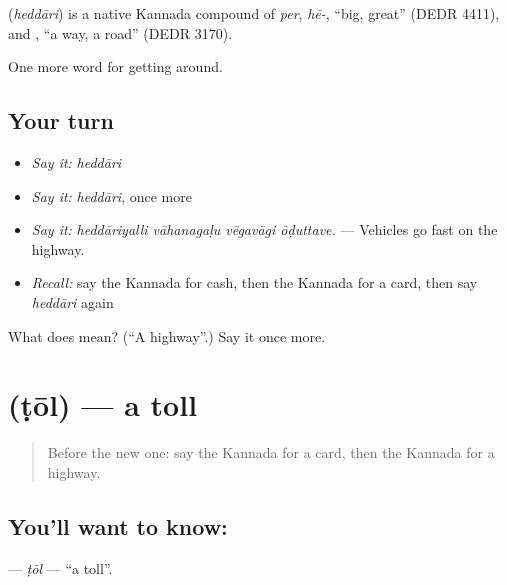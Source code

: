\begin{cousinweb}
\textbf{} (\emph{heddāri}) is a native Kannada compound of \emph{per}, \emph{hē-}, \textquotedblleft{}big, great\textquotedblright{} (DEDR 4411), and , \textquotedblleft{}a way, a road\textquotedblright{} (DEDR 3170).
\end{cousinweb}

\begin{grammarlens}[title={What you've built}]
One more word for getting around.
\end{grammarlens}

\subsection*{Your turn}
\begin{itemize}
\raggedright
  \item \emph{Say it:} \emph{heddāri}
  \item \emph{Say it:} \emph{heddāri}, once more
  \item \emph{Say it:} \emph{heddāriyalli vāhanagaḷu vēgavāgi ōḍuttave.} — Vehicles go fast on the highway.
  \item \emph{Recall:} say the Kannada for cash, then the Kannada for a card, then say \emph{heddāri} again
\end{itemize}

\begin{tcolorbox}[breakable,colback=teal!4,colframe=teal!35!black,title={Before you move on}]
What does  mean? (\textquotedblleft{}A highway\textquotedblright{}.) Say it once more.
\end{tcolorbox}
\section[\texorpdfstring{\kn{ಟೋಲ್} (ṭōl)}{ಟೋಲ್ (ṭōl)}]{ (ṭōl) — a toll}

\label{lesson:KA-C442-tol}



\begin{quote}
Before the new one: say the Kannada for a card, then the Kannada for a highway.
\end{quote}

\subsection*{You'll want to know: }
\textbf{} — \emph{ṭōl} — \textquotedblleft{}a toll\textquotedblright{}.

